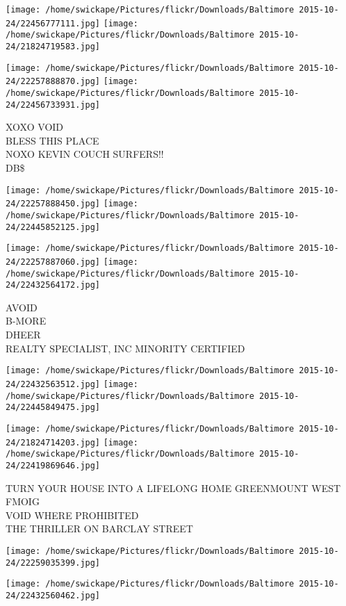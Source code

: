 \documentclass[10pt,letterpaper]{article}
\begin{document}
\texttt{[image: /home/swickape/Pictures/flickr/Downloads/Baltimore 2015-10-24/22456777111.jpg]}
\texttt{[image: /home/swickape/Pictures/flickr/Downloads/Baltimore 2015-10-24/21824719583.jpg]}

\texttt{[image: /home/swickape/Pictures/flickr/Downloads/Baltimore 2015-10-24/22257888870.jpg]}
\texttt{[image: /home/swickape/Pictures/flickr/Downloads/Baltimore 2015-10-24/22456733931.jpg]}

XOXO VOID\\
BLESS THIS PLACE\\
NOXO KEVIN COUCH SURFERS!!\\
DB\$
\pagebreak

\texttt{[image: /home/swickape/Pictures/flickr/Downloads/Baltimore 2015-10-24/22257888450.jpg]}
\texttt{[image: /home/swickape/Pictures/flickr/Downloads/Baltimore 2015-10-24/22445852125.jpg]}

\texttt{[image: /home/swickape/Pictures/flickr/Downloads/Baltimore 2015-10-24/22257887060.jpg]}
\texttt{[image: /home/swickape/Pictures/flickr/Downloads/Baltimore 2015-10-24/22432564172.jpg]}

AVOID\\
B{-}MORE\\
DHEER\\
REALTY SPECIALIST, INC MINORITY CERTIFIED
\pagebreak

\texttt{[image: /home/swickape/Pictures/flickr/Downloads/Baltimore 2015-10-24/22432563512.jpg]}
\texttt{[image: /home/swickape/Pictures/flickr/Downloads/Baltimore 2015-10-24/22445849475.jpg]}

\texttt{[image: /home/swickape/Pictures/flickr/Downloads/Baltimore 2015-10-24/21824714203.jpg]}
\texttt{[image: /home/swickape/Pictures/flickr/Downloads/Baltimore 2015-10-24/22419869646.jpg]}

TURN YOUR HOUSE INTO A LIFELONG HOME GREENMOUNT WEST\\
FMOIG\\
VOID WHERE PROHIBITED\\
THE THRILLER ON BARCLAY STREET
\pagebreak

\texttt{[image: /home/swickape/Pictures/flickr/Downloads/Baltimore 2015-10-24/22259035399.jpg]}

\vspace{0.25in}
\texttt{[image: /home/swickape/Pictures/flickr/Downloads/Baltimore 2015-10-24/22432560462.jpg]}
\end{document}
